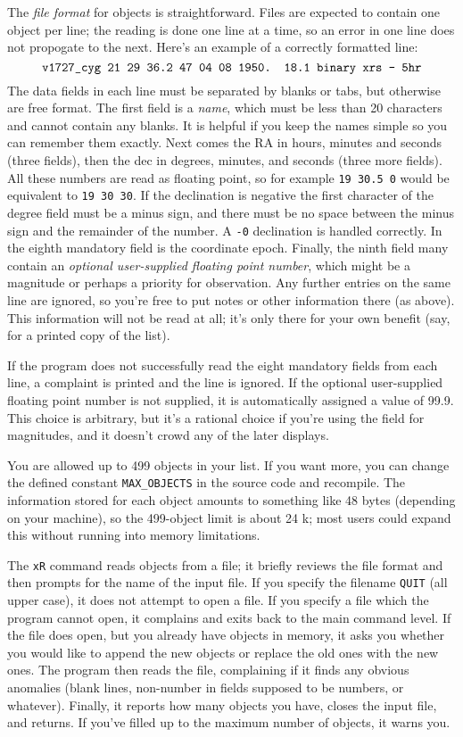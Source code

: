 The {\it file format} for objects is straightforward.
Files are expected to contain one object per line; the reading is 
done one line at a time, so an error in one line does not propogate 
to the next.   Here's an example of a correctly
formatted line: 
$$\hbox{\tt v1727\_cyg  21 29 36.2   47 04 08  1950. 18.1  binary xrs - 5hr}$$
The data fields in each line must be separated by
blanks or tabs, but otherwise are free format.  The first field
is a {\it name}, which must be less than 20 characters and cannot
contain any blanks.  It is helpful if you keep the names simple
so you can remember them exactly.
Next comes the RA in hours, minutes and seconds
(three fields), then the dec in degrees, minutes, and seconds (three
more fields).  All these numbers are read as floating point, so
for example {\tt 19 30.5 0} would be equivalent to {\tt 19 30 30}.
If the declination is negative the first character of the degree
field must be a minus sign, and there must be no space between the
minus sign and the remainder of the number.  A {\tt -0} declination 
is handled correctly.  In the eighth mandatory field is the coordinate
epoch.  Finally, the ninth field many contain an {\it optional user-supplied
floating point number}, which might be a magnitude or perhaps a priority
for observation.  Any further entries on the same line are ignored,
so you're free to put notes or other information there (as above).  
This information
will not be read at all; it's only there for your own benefit (say,
for a printed copy of the list).  

If the program does not successfully
read the eight mandatory fields from each line, a complaint is 
printed and the line
is ignored.  If the optional user-supplied floating point number is
not supplied, it is automatically assigned a value of 99.9.  This choice
is arbitrary, but it's 
a rational choice if you're using the field for magnitudes, and it
doesn't crowd any of the later displays.  
 
You are allowed up to 499 objects in your list.  If you want more, you
can change the defined constant {\tt MAX\_OBJECTS} in the source code
and recompile.  The information stored for each object amounts to 
something like 48 bytes (depending on your machine), so the 499-object
limit is about 24 k; most users could expand this without running into 
memory limitations.

The {\tt xR} command reads objects from a file; it briefly reviews the
file format and then prompts for
the name of the input file. If you specify the
filename {\tt QUIT} (all upper case), it does not attempt to open
a file.  If you specify a file which the program cannot open, it complains and 
exits back to the main command level.  If the file does open,
but you already have objects
in memory, it asks you whether you would like to append the new 
objects or replace the old ones with the new ones.  The program then
reads the file, complaining if it finds any obvious anomalies (blank lines,
non-number in fields supposed to be numbers, or whatever).  Finally, it
reports how many objects you have, closes the input file, and returns.
If you've filled up to the maximum number of objects, it warns you.

